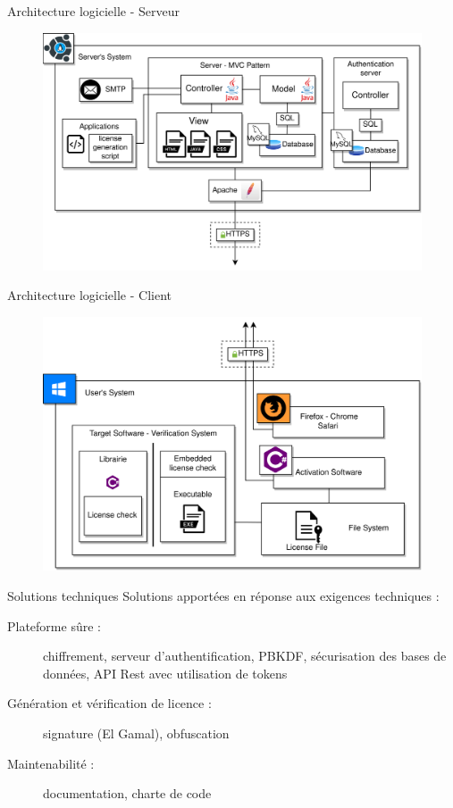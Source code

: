\documentclass{cubeamer}
\begin{document}
\begin{frame}{Architecture logicielle - Serveur}
    \begin{figure}
        \centering
        \includegraphics[scale=0.7]{img/DAT-server.png}
    \end{figure}
\end{frame}

\begin{frame}{Architecture logicielle - Client}
    \begin{figure}
        \centering
        \vspace{-0.8cm}
        \includegraphics[scale=0.72]{img/DAT-client.png}
    \end{figure}
\end{frame}

\begin{frame}{Solutions techniques}
    Solutions apportées en réponse aux exigences techniques :
    \begin{description}
        \item[Plateforme sûre : ] chiffrement, serveur d'authentification, PBKDF,
            sécurisation des bases de données, API Rest avec utilisation de tokens
        \item[Génération et vérification de licence : ] signature (El Gamal), obfuscation
        \item[Maintenabilité : ] documentation, charte de code
    \end{description}
\end{frame}    
\end{document}
